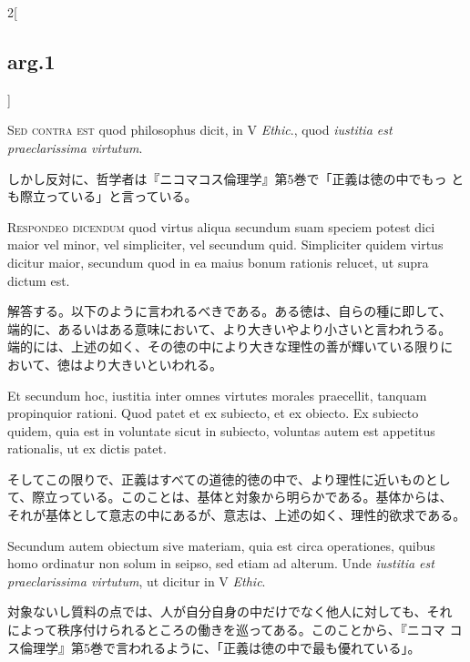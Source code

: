 \documentclass[paper=a4paper,fontsize=10pt,jafontsize=9pt,titlepage]{jlreq}
\begin{document}
\begin{paracol}{2}[\subsection{arg.1}]
\switchcolumn*[\subsection{s.c.}]

{\scshape Sed contra est} quod philosophus dicit, in V {\itshape
Ethic}., quod {\itshape iustitia est praeclarissima virtutum}.

\switchcolumn

しかし反対に、哲学者は『ニコマコス倫理学』第5巻で「正義は徳の中でもっ
とも際立っている」と言っている。


{\scshape Respondeo dicendum} quod virtus aliqua secundum suam speciem
potest dici maior vel minor, vel simpliciter, vel secundum
quid. Simpliciter quidem virtus dicitur maior, secundum quod in ea
maius bonum rationis relucet, ut supra dictum est.

\switchcolumn

解答する。以下のように言われるべきである。ある徳は、自らの種に即して、
端的に、あるいはある意味において、より大きいやより小さいと言われうる。
端的には、上述の如く、その徳の中により大きな理性の善が輝いている限りに
おいて、徳はより大きいといわれる。

\switchcolumn*

Et secundum hoc, iustitia inter omnes
virtutes morales praecellit, tanquam propinquior rationi. Quod patet
et ex subiecto, et ex obiecto. Ex subiecto quidem, quia est in
voluntate sicut in subiecto, voluntas autem est appetitus rationalis,
ut ex dictis patet.

\switchcolumn

そしてこの限りで、正義はすべての道徳的徳の中で、より理性に近いものとし
て、際立っている。このことは、基体と対象から明らかである。基体からは、
それが基体として意志の中にあるが、意志は、上述の如く、理性的欲求である。

\switchcolumn*

Secundum autem obiectum sive materiam, quia est circa operationes,
quibus homo ordinatur non solum in seipso, sed etiam ad alterum. Unde
{\itshape iustitia est praeclarissima virtutum}, ut dicitur in V
{\itshape Ethic}.

\switchcolumn

対象ないし質料の点では、人が自分自身の中だけでなく他人に対しても、それ
によって秩序付けられるところの働きを巡ってある。このことから、『ニコマ
コス倫理学』第5巻で言われるように、「正義は徳の中で最も優れている」。


\end{paracol}
\end{document}
